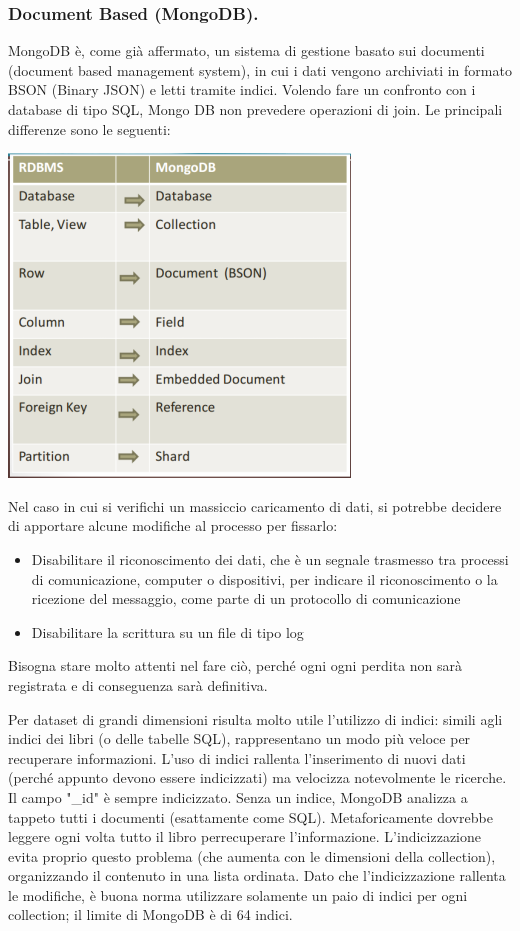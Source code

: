 \documentclass[a4page, 11pt]{article}
\begin{document}
\subsubsection{Document Based (MongoDB).}
MongoDB è, come già affermato, un sistema di gestione basato sui documenti (document based management system), in cui i dati vengono archiviati in formato BSON (Binary JSON) e letti tramite indici. Volendo fare un confronto con i database di tipo SQL, Mongo DB non prevedere operazioni di join. Le principali differenze sono le seguenti:
\begin{center}
	\includegraphics[scale=0.6]{IMAGE2.jpg}
\end{center}

Nel caso in cui si verifichi un massiccio caricamento di dati, si potrebbe decidere di apportare alcune modifiche al processo per fissarlo:
\begin{itemize}[noitemsep]
\item Disabilitare il riconoscimento dei dati, che è un segnale trasmesso tra processi di comunicazione, computer o dispositivi, per indicare il riconoscimento o la ricezione del messaggio, come parte di un protocollo di comunicazione
\item Disabilitare la scrittura su un file di tipo log
\end{itemize}
Bisogna stare molto attenti nel fare ciò, perché ogni ogni perdita non sarà registrata e di conseguenza sarà definitiva.
\newline

Per dataset di grandi dimensioni risulta molto utile l'utilizzo di indici: simili agli indici dei libri (o delle tabelle SQL), rappresentano un modo più veloce per recuperare informazioni.
L'uso di indici rallenta l'inserimento di nuovi dati (perché appunto devono essere indicizzati) ma velocizza notevolmente le ricerche. Il campo "\_id" è sempre indicizzato.
Senza un indice, MongoDB analizza a tappeto tutti i documenti (esattamente come SQL). Metaforicamente dovrebbe leggere ogni volta tutto il libro perrecuperare l'informazione.
L'indicizzazione evita proprio questo problema (che aumenta con le dimensioni della collection), organizzando il contenuto in una lista ordinata.
Dato che l'indicizzazione rallenta le modifiche, è buona norma utilizzare solamente un paio di indici per ogni collection; il limite di MongoDB è di 64 indici.
\end{document}

